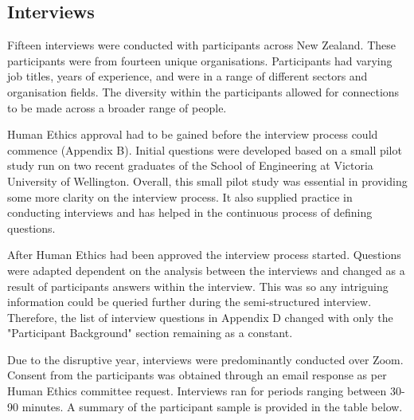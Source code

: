 \subsection{Interviews}

\par Fifteen interviews were conducted with participants across New Zealand. These participants were from fourteen unique organisations. Participants had varying job titles, years of experience, and were in a range of different sectors and organisation fields. The diversity within the participants allowed for connections to be made across a broader range of people. 
\newline
\par Human Ethics approval had to be gained before the interview process could commence (Appendix B). Initial questions were developed based on a small pilot study run on two recent graduates of the School of Engineering at Victoria University of Wellington. Overall, this small pilot study was essential in providing some more clarity on the interview process. It also supplied practice in conducting interviews and has helped in the continuous process of defining questions.
\newline
\par After Human Ethics had been approved the interview process started. Questions were adapted dependent on the analysis between the interviews and changed as a result of participants answers within the interview. This was so any intriguing information could be queried further during the semi-structured interview. Therefore, the list of interview questions in Appendix D changed with only the "Participant Background" section remaining as a constant.
\newline
\par Due to the disruptive year, interviews were predominantly conducted over Zoom. Consent from the participants was obtained through an email response as per Human Ethics committee request. Interviews ran for periods ranging between 30-90 minutes. A summary of the participant sample is provided in the table below. 
\newline
\newline

